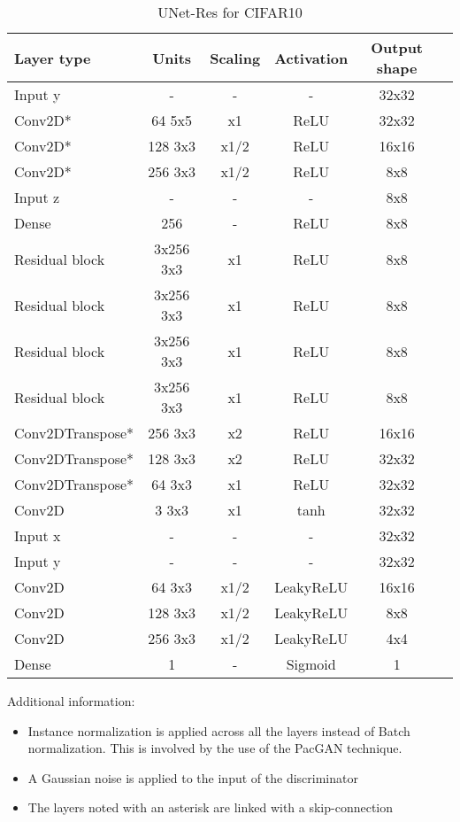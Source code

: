\begin{table*}[!h]
	\centering
	\begin{tabular}{|l|c|c|c|c|c|}
		\hline
		Layer type & Units & Scaling & Activation & Output shape\\
		\hline
		Input y & - & - & - & 32x32\\
		Conv2D* & 64 5x5 & x1 & ReLU & 32x32 \\
		Conv2D* & 128 3x3 & x1/2 & ReLU & 16x16 \\
		Conv2D* & 256 3x3 & x1/2 & ReLU & 8x8 \\
		Input z & - & - & - & 8x8\\
		Dense & 256 & - & ReLU & 8x8\\
		Residual block & 3x256 3x3 & x1 & ReLU & 8x8 \\
		Residual block & 3x256 3x3 & x1 & ReLU & 8x8 \\
		Residual block & 3x256 3x3 & x1 & ReLU & 8x8 \\
		Residual block & 3x256 3x3 & x1 & ReLU & 8x8 \\
		Conv2DTranspose* & 256 3x3 & x2 & ReLU & 16x16 \\
		Conv2DTranspose* & 128 3x3 & x2 & ReLU & 32x32 \\
		Conv2DTranspose* & 64 3x3 & x1 & ReLU & 32x32 \\
		Conv2D & 3 3x3 & x1 & tanh & 32x32 \\
		\hline
		Input x & - & - & - & 32x32\\
		Input y & - & - & - & 32x32\\
		Conv2D & 64 3x3 & x1/2 & LeakyReLU & 16x16 \\
		Conv2D & 128 3x3 & x1/2 & LeakyReLU & 8x8 \\
		Conv2D & 256 3x3 & x1/2 & LeakyReLU & 4x4 \\
		Dense & 1 & - & Sigmoid & 1\\
		\hline
	\end{tabular}
\label{subsec:Unet-Cifar}
	\caption{UNet-Res for CIFAR10} 
	
\end{table*}

Additional information: \begin{itemize}
	\item Instance normalization \citep{Ulyanov2016} is applied across all the layers instead of Batch normalization. This is involved by the use of the PacGAN technique.
	\item A Gaussian noise is applied to the input of the discriminator
	\item The layers noted with an asterisk are linked with a skip-connection
\end{itemize}
\newpage


